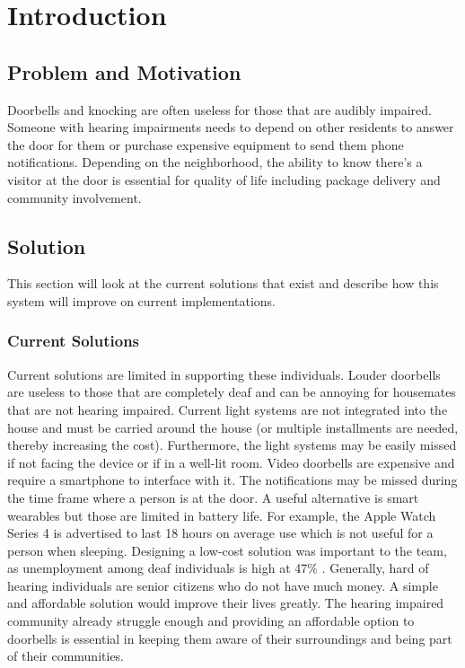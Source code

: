 \chapter{Introduction}

\section{Problem and Motivation}

Doorbells and knocking are often useless for those that are audibly impaired. Someone with hearing impairments needs to depend on other residents to answer the door for them or purchase expensive equipment to send them phone notifications. Depending on the neighborhood, the ability to know there’s a visitor at the door is essential for quality of life including package delivery and community involvement.

\section{Solution}
This section will look at the current solutions that exist and describe how this system will improve on current implementations.

\subsection{Current Solutions}
Current solutions are limited in supporting these individuals. Louder doorbells are useless to those that are completely deaf and can be annoying for housemates that are not hearing impaired. Current light systems are not integrated into the house and must be carried around the house (or multiple installments are needed, thereby increasing the cost). Furthermore, the light systems may be easily missed if not facing the device or if in a well-lit room. Video doorbells are expensive and require a smartphone to interface with it. The notifications may be missed during the time frame where a person is at the door. A useful alternative is smart wearables but those are limited in battery life. For example, the Apple Watch Series 4 is advertised to last 18 hours on average use \cite{website:apple-watch-battery} which is not useful for a person when sleeping. Designing a low-cost solution was important to the team, as unemployment among deaf individuals is high at 47\% \cite{pdf:deaf-employment}. Generally, hard of hearing individuals are senior citizens who do not have much money. A simple and affordable solution would improve their lives greatly. The hearing impaired community already struggle enough and providing an affordable option to doorbells is essential in keeping them aware of their surroundings and being part of their communities.

